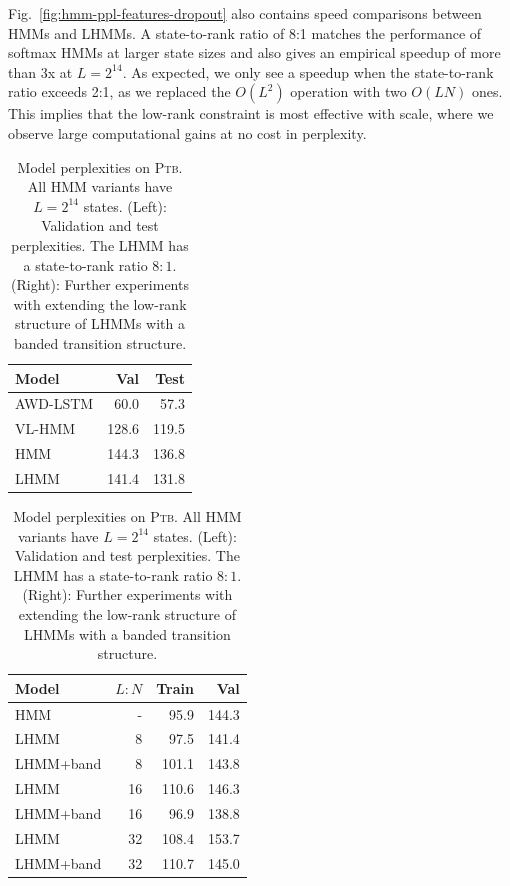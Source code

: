 \documentclass{article}
\begin{document}
Fig.~\ref{fig:hmm-ppl-features-dropout} also contains speed comparisons between HMMs and LHMMs.
A state-to-rank ratio of 8:1 matches the performance of softmax HMMs at larger state sizes and also gives an empirical speedup of more than 3x at $L = 2^{14}$.
As expected, we only see a speedup when the state-to-rank ratio exceeds 2:1, as we replaced the $O(L^2)$ operation with two $O(LN)$ ones. This implies that the low-rank constraint is most effective with scale, where we observe large computational gains at no cost in perplexity.



\begin{table}[!t]
\centering
\begin{minipage}[t]{0.4\textwidth}
\centering
\begin{tabular}{lrr}
\toprule
Model & Val & Test\\

\midrule
AWD-LSTM & 60.0 & 57.3\\
VL-HMM & 128.6 & 119.5\\
HMM & 144.3 & 136.8\\
LHMM & 141.4 & 131.8\\
\bottomrule
\end{tabular}
\end{minipage}
\vspace{0em}
\hfill
\begin{minipage}[t]{0.55\textwidth}
\centering
\begin{tabular}{lrrr}
\toprule
Model & $L:N$ & Train & Val\\
\midrule
HMM & -  & 95.9 & 144.3\\
LHMM & 8 & 97.5 & 141.4\\
LHMM+band & 8 & 101.1 & 143.8\\
LHMM & 16 & 110.6 & 146.3 \\
LHMM+band & 16 & 96.9 & 138.8\\
LHMM & 32 & 108.4 & 153.7 \\
LHMM+band & 32 & 110.7 & 145.0\\
\bottomrule
\end{tabular}
\end{minipage}
\vspace{0.5em}
\caption{\label{tbl:hmm}
Model perplexities on \textsc{Ptb}.
All HMM variants have $L=2^{14}$ states.
(Left): Validation and test perplexities.
The LHMM has a state-to-rank ratio $8:1$.
(Right): Further experiments with extending the low-rank structure of LHMMs with a banded transition structure.
}
\end{table}
\end{document}
